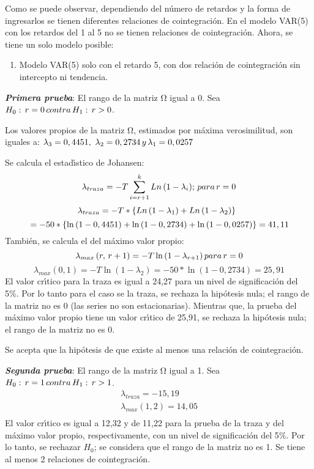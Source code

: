 Como se puede observar, dependiendo del n\'{u}mero de retardos y la forma de 
ingresarlos se tienen diferentes relaciones de cointegraci\'{o}n. En el 
modelo VAR(5) con los retardos del 1 al 5 no se tienen relaciones de 
cointegraci\'{o}n. Ahora, se tiene un solo modelo posible:

\begin{enumerate}
\item Modelo VAR(5) solo con el retardo 5, con dos relaci\'{o}n de cointegraci\'{o}n sin intercepto ni tendencia.
\end{enumerate}

\textbf{\textit{Primera prueba}}: El rango de la matriz $\mathrm{\Omega }$ 
igual a 0. Sea $H_{0}:\thinspace r=0\thinspace contra\thinspace 
H_{1}:\thinspace r>0$.

Los valores propios de la matriz $\mathrm{\Omega }$, estimados por 
m\'{a}xima verosimilitud, son iguales a: $\lambda_{3}=0,4451,\thinspace 
\thinspace \lambda_{2}=0,2734\thinspace y\thinspace \lambda_{1}=0,0257$

Se calcula el estad\'{\i}stico de Johansen: 
\[
\lambda_{traza}=-T\sum\limits_{i=r+1}^k {Ln\left( 1-\lambda_{i} \right)} 
;\thinspace para\thinspace r=0
\]
\[
\lambda_{traza}=-T\ast \left\{ Ln\left( 1-\lambda_{1} \right)+Ln\left( 
1-\lambda_{2} \right) \right\}\thinspace \thinspace \thinspace 
\]
\[
\thinspace =-50\ast \left\{ \ln \left( 1-0,4451 \right)+\ln \left( 1-0,2734 
\right)+\ln \left( 1-0,0257 \right) \right\}=41,11
\]
Tambi\'{e}n, se calcula el del m\'{a}ximo valor propio:
\[
\lambda_{max}\left( r,\thinspace r+1 \right)=-T\ln \left( 1-\lambda_{r+1} 
\right)para\thinspace r=0
\]
\[
\lambda_{max}\left( 0,1 \right)=-T\ln \left( 1-\lambda_{2} \right)=-50\ast 
\ln \left( 1-0,2734 \right)=25,91
\]
El valor cr\'{\i}tico para la traza es igual a 24,27 para un nivel de 
significaci\'{o}n del 5{\%}. Por lo tanto para el caso se la traza, se 
rechaza la hip\'{o}tesis nula; el rango de la matriz no es 0 (las series no 
son estacionarias). Mientras que, la prueba del m\'{a}ximo valor propio 
tiene un valor cr\'{\i}tico de 25,91, se rechaza la hip\'{o}tesis nula; el 
rango de la matriz no es 0.

Se acepta que la hip\'{o}tesis de que existe al menos una relaci\'{o}n de 
cointegraci\'{o}n.

\textbf{\textit{Segunda prueba}}: El rango de la matriz $\mathrm{\Omega }$ 
igual a 1. Sea $H_{0}:\thinspace r=1\thinspace contra\thinspace 
H_{1}:\thinspace r>1$.
\[
\begin{array}{l}
 \lambda_{traza}=-15,19 \\ 
 \lambda_{max}\left( 1,2 \right)=14,05 \\ 
 \end{array}
\]
El valor cr\'{\i}tico es igual a 12,32 y de 11,22 para la prueba de la traza 
y del m\'{a}ximo valor propio, respectivamente, con un nivel de 
significaci\'{o}n del 5{\%}. Por lo tanto, se rechazar $H_{0}$; se considera 
que el rango de la matriz no es 1. Se tiene al menos 2 relaciones de 
cointegraci\'{o}n.

